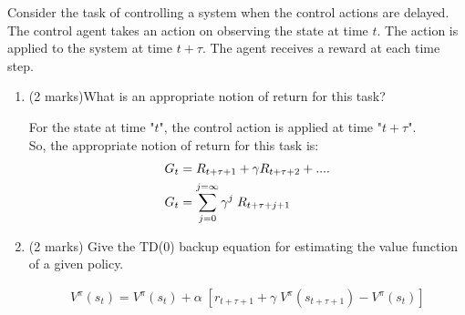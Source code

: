 \documentclass[addpoints,12pt,solution]{exam}
\begin{document}
\begin{questions}
\question[4] Consider the task of controlling a system when the control actions are delayed. The control agent takes an action on observing the state at time $t$. The action is applied to the system at time $t + \tau$. The agent
receives a reward at each time step.
\begin{enumerate}[label=(\alph*)]
\item (2 marks)What is an appropriate notion of return for this task?
\begin{solution}
For the state at time "$t$", the control action is applied at time "$t+\tau$".\\
So, the appropriate notion of return for this task is:\\
\begin{align}
    G_{t} &= R_{t+\tau+1} +\gamma R_{t+\tau+2} + ....\notag\\ 
    G_{t} &= \sum_{j=0}^{j=\infty} \gamma^{j} \; R_{t+\tau+j+1}
\end{align}
\end{solution}
\item (2 marks) Give the TD(0) backup equation for estimating the value function of a given policy.
\begin{solution}
\begin{align}
    V^{\pi}(s_{t}) = V^{\pi}(s_{t}) + \alpha\;[r_{t+\tau+1} + \gamma \; V^{\pi}(s_{t+\tau+1}) - V^{\pi}(s_{t})]
\end{align}
\end{solution}
\end{enumerate}
\end{questions}
\end{document}

